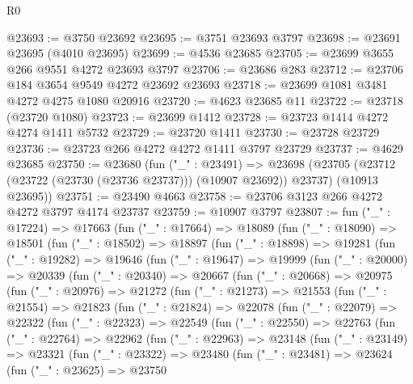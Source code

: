 \begin{lexlean}{R0}
\begin{coremodule}
@23693 := @3750 @23692
@23695 := @3751 @23693 @3797
@23698 := @23691 @23695 (@4010 @23695)
@23699 := @4536 @23685
@23705 := @23699 @3655 @266 @9551 @4272 @23693 @3797
@23706 := @23686 @283
@23712 := @23706 @184 @3654 @9549 @4272 @23692 @23693
@23718 := @23699 @1081 @3481 @4272 @4275 @1080 @20916
@23720 := @4623 @23685 @11
@23722 := @23718 (@23720 @1080)
@23723 := @23699 @1412
@23728 := @23723 @1414 @4272 @4274 @1411 @5732
@23729 := @23720 @1411
@23730 := @23728 @23729
@23736 := @23723 @266 @4272 @4272 @1411 @3797 @23729
@23737 := @4629 @23685
@23750 := @23680
    (fun ("_" : @23491) =>
    @23698
      (@23705 (@23712 (@23722 (@23730 (@23736 @23737))) (@10907 @23692)) @23737)
      (@10913 @23695))
@23751 := @23490 @4663
@23758 := @23706 @3123 @266 @4272 @4272 @3797 @4174 @23737
@23759 := @10907 @3797
@23807 := fun ("_" : @17224) =>
  @17663
    (fun ("_" : @17664) =>
    @18089
      (fun ("_" : @18090) =>
      @18501
        (fun ("_" : @18502) =>
        @18897
          (fun ("_" : @18898) =>
          @19281
            (fun ("_" : @19282) =>
            @19646
              (fun ("_" : @19647) =>
              @19999
                (fun ("_" : @20000) =>
                @20339
                  (fun ("_" : @20340) =>
                  @20667
                    (fun ("_" : @20668) =>
                    @20975
                      (fun ("_" : @20976) =>
                      @21272
                        (fun ("_" : @21273) =>
                        @21553
                          (fun ("_" : @21554) =>
                          @21823
                            (fun ("_" : @21824) =>
                            @22078
                              (fun ("_" : @22079) =>
                              @22322
                                (fun ("_" : @22323) =>
                                @22549
                                  (fun ("_" : @22550) =>
                                  @22763
                                    (fun ("_" : @22764) =>
                                    @22962
                                      (fun ("_" : @22963) =>
                                      @23148
                                        (fun ("_" : @23149) =>
                                        @23321
                                          (fun ("_" : @23322) =>
                                          @23480
                                            (fun ("_" : @23481) =>
                                            @23624
                                              (fun ("_" : @23625) =>
                                              @23750

\end{coremodule}
\end{lexlean}
